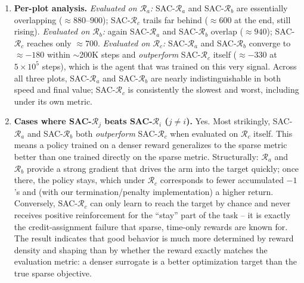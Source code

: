 \documentclass[12pt]{scrartcl}
\begin{document}
\begin{enumerate}
\begin{enumerate}[label=(\alph*)]
        \begin{enumerate}[label=(\roman*)]
            \item \textbf{Per-plot analysis.}
            \emph{Evaluated on $\mathcal{R}_a$:} SAC-$\mathcal{R}_a$ and SAC-$\mathcal{R}_b$ are essentially overlapping ($\approx 880$--$900$); SAC-$\mathcal{R}_c$ trails far behind ($\approx 600$ at the end, still rising).
            \emph{Evaluated on $\mathcal{R}_b$:} again SAC-$\mathcal{R}_a$ and SAC-$\mathcal{R}_b$ overlap ($\approx 940$); SAC-$\mathcal{R}_c$ reaches only $\approx 700$.
            \emph{Evaluated on $\mathcal{R}_c$:} SAC-$\mathcal{R}_a$ and SAC-$\mathcal{R}_b$ converge to $\approx -180$ within $\sim$200K steps and \emph{outperform} SAC-$\mathcal{R}_c$ itself ($\approx -330$ at $5\times10^5$ steps), which is the agent that was trained on this very signal.
            Across all three plots, SAC-$\mathcal{R}_a$ and SAC-$\mathcal{R}_b$ are nearly indistinguishable in both speed and final value; SAC-$\mathcal{R}_c$ is consistently the slowest and worst, including under its own metric.

            \item \textbf{Cases where SAC-$\mathcal{R}_j$ beats SAC-$\mathcal{R}_i$ ($j\neq i$).}
            Yes. Most strikingly, SAC-$\mathcal{R}_a$ and SAC-$\mathcal{R}_b$ both \emph{outperform} SAC-$\mathcal{R}_c$ when evaluated on $\mathcal{R}_c$ itself. This means a policy trained on a denser reward generalizes to the sparse metric better than one trained directly on the sparse metric. Structurally: $\mathcal{R}_a$ and $\mathcal{R}_b$ provide a strong gradient that drives the arm into the target quickly; once there, the policy stays, which under $\mathcal{R}_c$ corresponds to fewer accumulated $-1$'s and (with our termination/penalty implementation) a higher return. Conversely, SAC-$\mathcal{R}_c$ can only learn to reach the target by chance and never receives positive reinforcement for the ``stay'' part of the task -- it is exactly the credit-assignment failure that sparse, time-only rewards are known for. The result indicates that good behavior is much more determined by reward density and shaping than by whether the reward exactly matches the evaluation metric: a denser surrogate is a better optimization target than the true sparse objective.


\end{enumerate}
\end{enumerate}
\end{enumerate}
\end{document}
